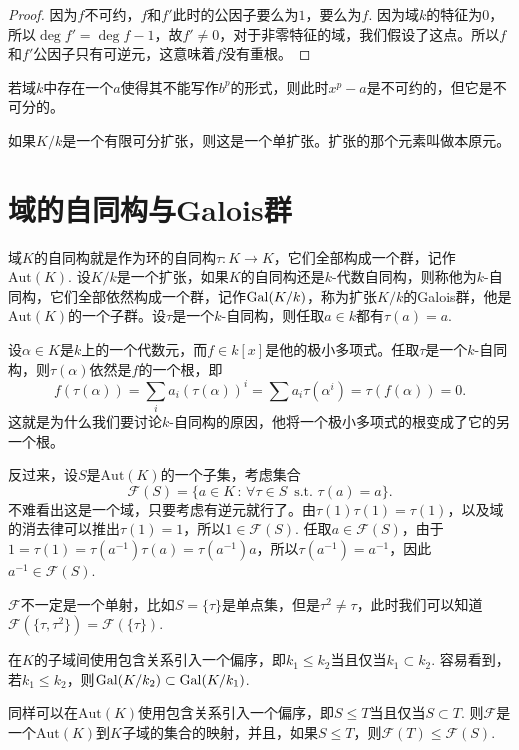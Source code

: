 \begin{proof}
    因为$f$不可约，$f$和$f'$此时的公因子要么为$1$，要么为$f$. 因为域$k$的特征为$0$，所以$\deg f'=\deg f-1$，故$f'\neq 0$，对于非零特征的域，我们假设了这点。所以$f$和$f'$公因子只有可逆元，这意味着$f$没有重根。
\end{proof}

若域$k$中存在一个$a$使得其不能写作$b^p$的形式，则此时$x^p-a$是不可约的，但它是不可分的。

\begin{theo}[本原元定理]
如果$K/k$是一个有限可分扩张，则这是一个单扩张。扩张的那个元素叫做本原元。
\end{theo}

\section{域的自同构与Galois群}

\para 域$K$的自同构就是作为环的自同构$\tau:K\to K$，它们全部构成一个群，记作$\mathrm{Aut}(K)$. 设$K/k$是一个扩张，如果$K$的自同构还是$k$-代数自同构，则称他为$k$-自同构，它们全部依然构成一个群，记作$\operatorname{Gal}(K/k)$，称为扩张$K/k$的Galois群，他是$\mathrm{Aut}(K)$的一个子群。设$\tau$是一个$k$-自同构，则任取$a\in k$都有$\tau(a)=a$.

设$\alpha\in K$是$k$上的一个代数元，而$f\in k[x]$是他的极小多项式。任取$\tau$是一个$k$-自同构，则$\tau(\alpha)$依然是$f$的一个根，即
\[
    f(\tau(\alpha))=\sum_i a_i (\tau(\alpha))^i=\sum a_i \tau(\alpha^i)=\tau(f(\alpha))=0.
\]
这就是为什么我们要讨论$k$-自同构的原因，他将一个极小多项式的根变成了它的另一个根。

\para 反过来，设$S$是$\mathrm{Aut}(K)$的一个子集，考虑集合
\[
    \mathcal{F}(S)=\{a\in K\,:\, \forall \tau\in S\,\text{ s.t. }\tau(a)=a\}.
\]
不难看出这是一个域，只要考虑有逆元就行了。由$\tau(1)\tau(1)=\tau(1)$，以及域的消去律可以推出$\tau(1)=1$，所以$1\in \mathcal{F}(S)$.
任取$a\in \mathcal{F}(S)$，由于$1=\tau(1)=\tau(a^{-1})\tau(a)=\tau(a^{-1})a$，所以$\tau(a^{-1})=a^{-1}$，因此$a^{-1}\in \mathcal{F}(S)$.
\endpara

$\mathcal{F}$不一定是一个单射，比如$S=\{\tau\}$是单点集，但是$\tau^2\neq \tau$，此时我们可以知道$\mathcal{F}(\{\tau,\tau^2\})=\mathcal{F}(\{\tau\})$.

\para 在$K$的子域间使用包含关系引入一个偏序，即$k_1\leq k_2$当且仅当$k_1\subset k_2$. 容易看到，若$k_1\leq k_2$，则$\operatorname{Gal}(K/k_2)\subset \operatorname{Gal}(K/k_1)$.

同样可以在$\mathrm{Aut}(K)$使用包含关系引入一个偏序，即$S\leq T$当且仅当$S\subset T$. 则$\mathcal{F}$是一个$\mathrm{Aut}(K)$到$K$子域的集合的映射，并且，如果$S\leq T$，则$\mathcal{F}(T)\leq \mathcal{F}(S)$.


